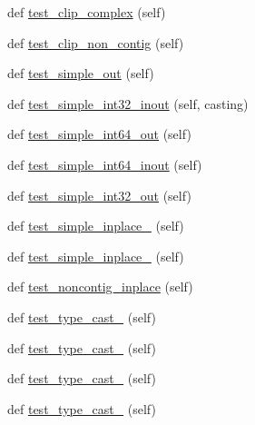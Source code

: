 \begin{DoxyCompactItemize}
def \hyperlink{classnumpy_1_1core_1_1tests_1_1test__numeric_1_1TestClip_a638f137686d0848d56a8c97b18e2ed68}{test\+\_\+clip\+\_\+complex} (self)
\item 
def \hyperlink{classnumpy_1_1core_1_1tests_1_1test__numeric_1_1TestClip_a117588a4718e22b844678cdbcf976bce}{test\+\_\+clip\+\_\+non\+\_\+contig} (self)
\item 
def \hyperlink{classnumpy_1_1core_1_1tests_1_1test__numeric_1_1TestClip_a0fc6f322686624149c9d1a7b5d89695c}{test\+\_\+simple\+\_\+out} (self)
\item 
def \hyperlink{classnumpy_1_1core_1_1tests_1_1test__numeric_1_1TestClip_a7c9351f02b298e67808679c01d47f251}{test\+\_\+simple\+\_\+int32\+\_\+inout} (self, casting)
\item 
def \hyperlink{classnumpy_1_1core_1_1tests_1_1test__numeric_1_1TestClip_a14244cb2ccfbb3ad13292bcf769002c9}{test\+\_\+simple\+\_\+int64\+\_\+out} (self)
\item 
def \hyperlink{classnumpy_1_1core_1_1tests_1_1test__numeric_1_1TestClip_a34de037eb140ecea7387f7f658626472}{test\+\_\+simple\+\_\+int64\+\_\+inout} (self)
\item 
def \hyperlink{classnumpy_1_1core_1_1tests_1_1test__numeric_1_1TestClip_aa2255691c7723753410417106276df56}{test\+\_\+simple\+\_\+int32\+\_\+out} (self)
\item 
def \hyperlink{classnumpy_1_1core_1_1tests_1_1test__numeric_1_1TestClip_ae5c01e7641523b307c5c2b3c69c58661}{test\+\_\+simple\+\_\+inplace\+\_} (self)
\item 
def \hyperlink{classnumpy_1_1core_1_1tests_1_1test__numeric_1_1TestClip_ac81555bb4945d5a106d27f4c8e544079}{test\+\_\+simple\+\_\+inplace\+\_} (self)
\item 
def \hyperlink{classnumpy_1_1core_1_1tests_1_1test__numeric_1_1TestClip_a825371b00cf88b42f3818fc2b3cdceb6}{test\+\_\+noncontig\+\_\+inplace} (self)
\item 
def \hyperlink{classnumpy_1_1core_1_1tests_1_1test__numeric_1_1TestClip_afe7c66a8ec7b262fe2816bb6d992e58a}{test\+\_\+type\+\_\+cast\+\_} (self)
\item 
def \hyperlink{classnumpy_1_1core_1_1tests_1_1test__numeric_1_1TestClip_adafbfa2da670fb837a553ad803887d5e}{test\+\_\+type\+\_\+cast\+\_} (self)
\item 
def \hyperlink{classnumpy_1_1core_1_1tests_1_1test__numeric_1_1TestClip_ad8f1921236d7552281559a4dc84d9747}{test\+\_\+type\+\_\+cast\+\_} (self)
\item 
def \hyperlink{classnumpy_1_1core_1_1tests_1_1test__numeric_1_1TestClip_a930ee994e376aceccaf3d36275b07d7f}{test\+\_\+type\+\_\+cast\+\_} (self)

\end{DoxyCompactItemize}
